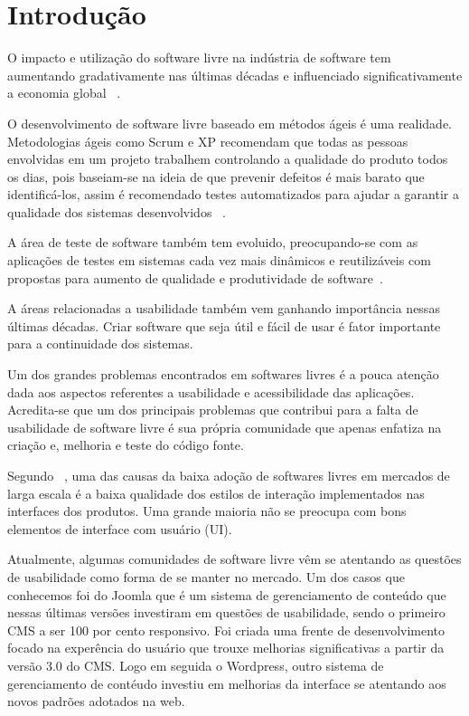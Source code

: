 \chapter{Introdução}

O impacto e utilização do software livre na indústria de software tem aumentando gradativamente nas últimas décadas e influenciado significativamente a economia global ~\cite{benkler2006}. 

O desenvolvimento de software livre baseado em métodos ágeis é uma realidade. Metodologias ágeis como Scrum e XP recomendam que todas as pessoas envolvidas em um projeto trabalhem controlando a qualidade do produto todos os dias, pois baseiam-se na ideia de que prevenir defeitos é mais barato que identificá-los, assim é recomendado testes automatizados para ajudar a garantir a qualidade dos sistemas desenvolvidos ~\cite{bernardo2011}.

A área de teste de software também tem evoluido, preocupando-se com as aplicações de testes em sistemas cada vez mais dinâmicos e reutilizáveis com propostas para aumento de qualidade e produtividade de software~\cite{vicente2010}.

A áreas relacionadas a usabilidade também vem ganhando importância nessas últimas décadas. Criar software que seja útil e fácil de usar é fator importante para a continuidade dos sistemas.

Um dos grandes problemas encontrados em softwares livres é a pouca atenção dada aos aspectos referentes a usabilidade e acessibilidade das aplicações. Acredita-se que um dos principais problemas que contribui para a falta de usabilidade de software livre é sua própria comunidade que apenas enfatiza na criação e, melhoria e teste do código fonte.  

Segundo ~, uma das causas da baixa adoção de softwares livres em mercados de larga escala é a baixa qualidade dos estilos de interação implementados nas interfaces dos produtos. Uma grande maioria não se preocupa com bons elementos de interface com usuário (UI). 

Atualmente, algumas comunidades de software livre vêm se atentando as questões de usabilidade como forma de se manter no mercado. Um dos casos que conhecemos foi do Joomla que é um sistema de gerenciamento de conteúdo  que nessas últimas versões investiram em questões de usabilidade, sendo o primeiro CMS a ser 100 por cento responsivo. Foi criada uma frente de desenvolvimento focado na experência do usuário que trouxe melhorias significativas a partir da versão 3.0 do CMS. Logo em seguida o Wordpress, outro sistema de gerenciamento de contéudo investiu em melhorias da interface se atentando aos novos padrões adotados na web.

